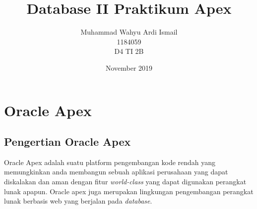 \documentclass{article}
\title{Database II Praktikum Apex}
\author{Muhammad Wahyu Ardi Ismail \\1184059 \\D4 TI 2B }
\date{November 2019}
\begin{document}
\maketitle

\newpage

\section{Oracle Apex}
\subsection{Pengertian Oracle Apex}
\par Oracle Apex adalah suatu platform pengembangan kode rendah yang memungkinkan anda membangun sebuah aplikasi perusahaan yang dapat diskalakan dan aman dengan fitur \textit{world-class} yang dapat digunakan perangkat lunak apapun. Oracle apex juga merupakan lingkungan pengembangan perangkat
lunak berbasis web yang berjalan pada \textit{database}.
\end{document}

